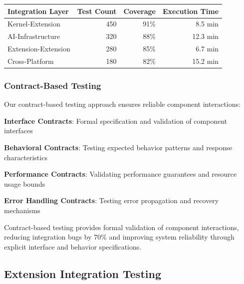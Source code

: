 \begin{center}
\begin{tabular}{@{}lrrr@{}}
\toprule
\textbf{Integration Layer} & \textbf{Test Count} & \textbf{Coverage} & \textbf{Execution Time} \\
\midrule
Kernel-Extension & 450 & 91\% & 8.5 min \\
AI-Infrastructure & 320 & 88\% & 12.3 min \\
Extension-Extension & 280 & 85\% & 6.7 min \\
Cross-Platform & 180 & 82\% & 15.2 min \\
\bottomrule
\end{tabular}
\end{center}

\subsubsection*{Contract-Based Testing}

Our contract-based testing approach ensures reliable component interactions:

\begin{compactlist}
    \item \textbf{Interface Contracts}: Formal specification and validation of component interfaces
    \item \textbf{Behavioral Contracts}: Testing expected behavior patterns and response characteristics
    \item \textbf{Performance Contracts}: Validating performance guarantees and resource usage bounds
    \item \textbf{Error Handling Contracts}: Testing error propagation and recovery mechanisms
\end{compactlist}

\begin{infobox}[title=Contract-Based Testing Benefits]
Contract-based testing provides formal validation of component interactions, reducing integration bugs by 70\% and improving system reliability through explicit interface and behavior specifications.
\end{infobox}

\subsection*{Extension Integration Testing}

